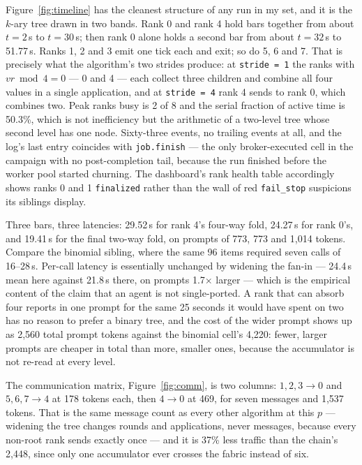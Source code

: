 \documentclass[11pt]{article}
\begin{document}
Figure~\ref{fig:timeline} has the cleanest structure of any run in my set, and it is the
$k$-ary tree drawn in two bands. Rank 0 and rank 4 hold bars together from about $t=2$\,s
to $t=30$\,s; then rank 0 alone holds a second bar from about $t=32$\,s to 51.77\,s. Ranks
1, 2 and 3 emit one tick each and exit; so do 5, 6 and 7. That is precisely what the
algorithm's two strides produce: at \texttt{stride = 1} the ranks with $vr \bmod 4 = 0$
--- 0 and 4 --- each collect three children and combine all four values in a single
application, and at \texttt{stride = 4} rank 4 sends to rank 0, which combines two. Peak
ranks busy is 2 of 8 and the serial fraction of active time is 50.3\%, which is not
inefficiency but the arithmetic of a two-level tree whose second level has one node.
Sixty-three events, no trailing events at all, and the log's last entry coincides with
\texttt{job.finish} --- the only broker-executed cell in the campaign with no
post-completion tail, because the run finished before the worker pool started churning.
The dashboard's rank health table accordingly shows ranks 0 and 1 \texttt{finalized}
rather than the wall of red \texttt{fail\_stop} suspicions its siblings display.

Three bars, three latencies: 29.52\,s for rank 4's four-way fold, 24.27\,s for rank 0's,
and 19.41\,s for the final two-way fold, on prompts of 773, 773 and 1{,}014 tokens.
Compare the binomial sibling, where the same 96 items required seven calls of 16--28\,s.
Per-call latency is essentially unchanged by widening the fan-in --- 24.4\,s mean here
against 21.8\,s there, on prompts 1.7$\times$ larger --- which is the empirical content of
the claim that an agent is not single-ported. A rank that can absorb four reports in one
prompt for the same 25 seconds it would have spent on two has no reason to prefer a binary
tree, and the cost of the wider prompt shows up as 2{,}560 total prompt tokens against the
binomial cell's 4{,}220: fewer, larger prompts are cheaper in total than more, smaller
ones, because the accumulator is not re-read at every level.

The communication matrix, Figure~\ref{fig:comm}, is two columns: $1,2,3\!\to\!0$ and
$5,6,7\!\to\!4$ at 178 tokens each, then $4\!\to\!0$ at 469, for seven messages and 1{,}537
tokens. That is the same message count as every other algorithm at this $p$ --- widening
the tree changes rounds and applications, never messages, because every non-root rank
sends exactly once --- and it is 37\% less traffic than the chain's 2{,}448, since only one
accumulator ever crosses the fabric instead of six.
\end{document}
